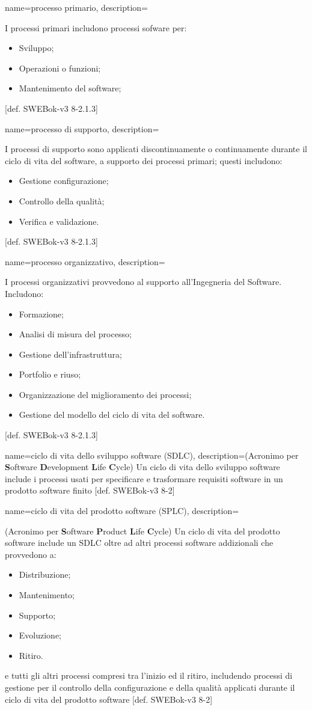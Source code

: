 {
name=processo primario,
description={I processi primari includono processi sofware per: \begin{itemize}
\item Sviluppo;
\item Operazioni o funzioni;
\item Mantenimento del software;
\end{itemize}
[def. SWEBok-v3 8-2.1.3]}
}

{
name=processo di supporto,
description={I processi di supporto sono applicati discontinuamente o continuamente durante il ciclo di vita del software, a supporto dei processi primari; questi includono:\begin{itemize}
\item Gestione configurazione;
\item Controllo della qualit\`a;
\item Verifica e validazione.
\end{itemize}
[def. SWEBok-v3 8-2.1.3]}
}

{
name=processo organizzativo,
description={I processi organizzativi provvedono al supporto all'Ingegneria del Software. Includono: \begin{itemize}
\item Formazione;
\item Analisi di misura del processo;
\item Gestione dell'infrastruttura;
\item Portfolio e riuso;
\item Organizzazione del miglioramento dei processi;
\item Gestione del modello del ciclo di vita del software.
\end{itemize}
[def. SWEBok-v3 8-2.1.3]}
}

{
name=ciclo di vita dello sviluppo software (SDLC),
description={(Acronimo per \textbf{S}oftware \textbf{D}evelopment \textbf{L}ife \textbf{C}ycle) Un ciclo di vita dello sviluppo software include i processi usati per specificare e trasformare requisiti software in un prodotto software finito [def. SWEBok-v3 8-2]}
}

{
name=ciclo di vita del prodotto software (SPLC),
description={(Acronimo per \textbf{S}oftware \textbf{P}roduct \textbf{L}ife \textbf{C}ycle) Un ciclo di vita del prodotto software include un SDLC oltre ad altri processi software addizionali che provvedono a: \begin{itemize}
\item Distribuzione;
\item Mantenimento;
\item Supporto;
\item Evoluzione;
\item Ritiro.
\end{itemize}
e tutti gli altri processi compresi tra l'inizio ed il ritiro, includendo processi di gestione per il controllo della configurazione e della qualit\`a applicati durante il ciclo di vita del prodotto software [def. SWEBok-v3 8-2]}
}

